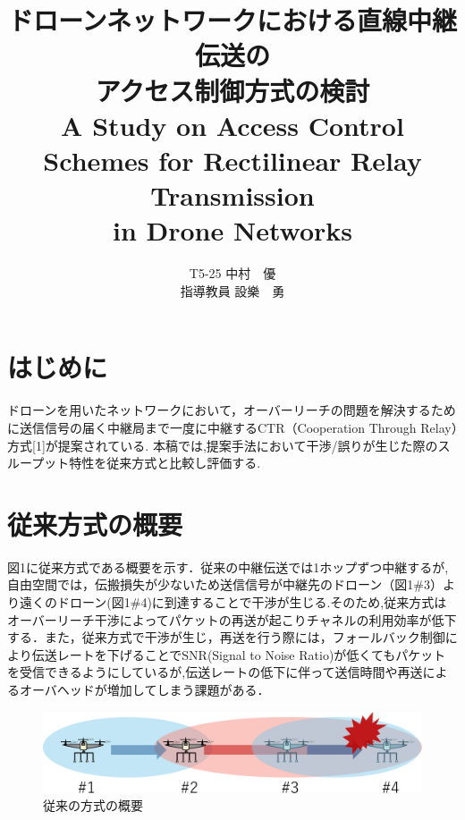 \documentclass[a4paper,10pt]{ltjsarticle}
\title{\huge ドローンネットワークにおける直線中継伝送の\\アクセス制御方式の検討\\
\Large A Study on Access Control Schemes for Rectilinear Relay Transmission \\in Drone Networks
}
\author{
T5-25 \:中村　優\\
指導教員 \: 設樂　勇
}
\date{}
\begin{document}
\twocolumn[
\maketitle
]

\section{はじめに}
ドローンを用いたネットワークにおいて，オーバーリーチの問題を解決するために送信信号の届く中継局まで一度に中継するCTR（Cooperation Through Relay）方式[1]が提案されている. 本稿では,提案手法において干渉/誤りが生じた際のスループット特性を従来方式と比較し評価する.
\section{従来方式の概要}
図1に従来方式である概要を示す．従来の中継伝送では1ホップずつ中継するが,自由空間では，伝搬損失が少ないため送信信号が中継先のドローン（図1\#3）より遠くのドローン(図1\#4)に到達することで干渉が生じる.そのため,従来方式はオーバーリーチ干渉によってパケットの再送が起こりチャネルの利用効率が低下する．また，従来方式で干渉が生じ，再送を行う際には，フォールバック制御により伝送レートを下げることでSNR(Signal to Noise Ratio)が低くてもパケットを受信できるようにしているが,伝送レートの低下に伴って送信時間や再送によるオーバヘッドが増加してしまう課題がある．%

\begin{figure}[H]
  \centering
  \includegraphics[width=\linewidth]{cenventional_topology.pdf} %
  \caption{従来の方式の概要}
  \label{fig:従来の方式のトポロジー} %
\end{figure}
\end{document}
